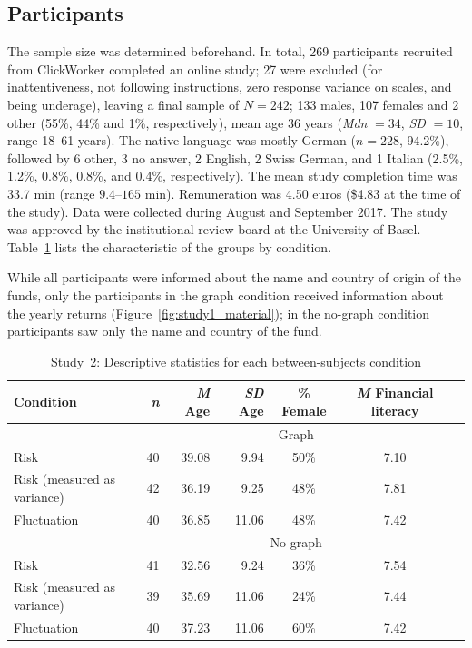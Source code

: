 \documentclass[a4paper,man, natbib,floatsintext]{apa6} %
\begin{document}
\subsection{Participants}
The sample size was determined beforehand. In total, 269 participants recruited from ClickWorker completed an online study; 27 were excluded (for inattentiveness, not following instructions, zero response variance on scales, and being underage), leaving a final sample of $N = 242$; 133 males, 107 females and 2 other (55\%, 44\% and 1\%, respectively), mean age 36 years (\textit{Mdn} $ = 34$, \textit{SD} $= 10$, range 18--61 years). The native language was mostly German ($n = 228$, 94.2\%), followed by 6 other, 3 no answer, 2 English, 2 Swiss German,  and 1 Italian (2.5\%, 1.2\%, 0.8\%, 0.8\%, and 0.4\%, respectively). The mean study completion time was 33.7 min (range $9.4$--$165$ min). Remuneration was 4.50 euros (\$4.83 at the time of the study). Data were collected during August and September 2017. The study was approved by the institutional review board at the University of Basel. Table~\ref{tab:study2_subsample} lists the characteristic of the groups by condition.

While all participants were informed about the name and country of origin of the funds, only the participants in the graph condition received information about the yearly returns (Figure~\ref{fig:study1_material}); in the no-graph condition participants saw only the name and country of the fund. 

\begin{table}[ht]
\centering
\caption{Study~2: Descriptive statistics for each between-subjects condition}
\label{tab:study2_subsample}
\begin{tabular}{lrrrccc}
\toprule
  Condition & \textit{n} & \textit{M} Age & \textit{SD} Age & \% Female & \textit{M} Financial literacy \\ 
    \toprule
    & \multicolumn{5}{c}{Graph}\\
   \cmidrule{2-6}
   Risk &  40 & 39.08 & 9.94 & 50\% & 7.10 \\ 
   Risk (measured as variance) &  42 & 36.19 & 9.25 & 48\% & 7.81 \\ 
   Fluctuation &  40 & 36.85 & 11.06 & 48\% & 7.42 \\ 
   \midrule
  & \multicolumn{5}{c}{No graph}\\
  \cmidrule{2-6}
  Risk &  41 & 32.56 & 9.24 & 36\% & 7.54 \\ 
  Risk (measured as variance) &  39 & 35.69 & 11.06 & 24\% & 7.44 \\ 
  Fluctuation &  40 & 37.23 & 11.06 & 60\% & 7.42 \\ 
   \bottomrule
\end{tabular}
\end{table}
\end{document}
